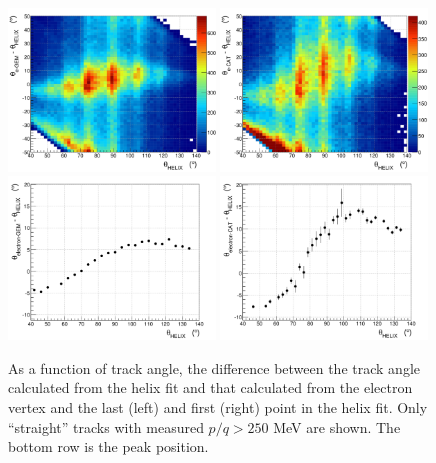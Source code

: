 \documentclass[amsmath,amssymb,notitlepage,11pt]{revtex4-1}
\begin{document}
\begin{figure}[htbp]\centering
    \includegraphics[width=0.49\textwidth]{pics/dtheta_theta_elgem-helix_poverq250.png}
    \includegraphics[width=0.49\textwidth]{pics/dtheta_theta_elcat-helix_poverq250.png}
    \includegraphics[width=0.49\textwidth]{pics/dtheta_theta_elgem-helix_poverq_gt_250_FIT_small2.png}
    \includegraphics[width=0.49\textwidth]{pics/dtheta_theta_elcat-helix_poverq_gt_250_FIT_small.png}
    \caption{As a function of track angle, the difference between the track angle calculated from the helix fit and that calculated from the electron vertex and the last (left) and first (right) point in the helix fit.  Only ``straight'' tracks with measured $p/q>250$ MeV are shown.  The bottom row is the peak position.\label{fig:dthetacatgem}}
\end{figure}
\end{document}
